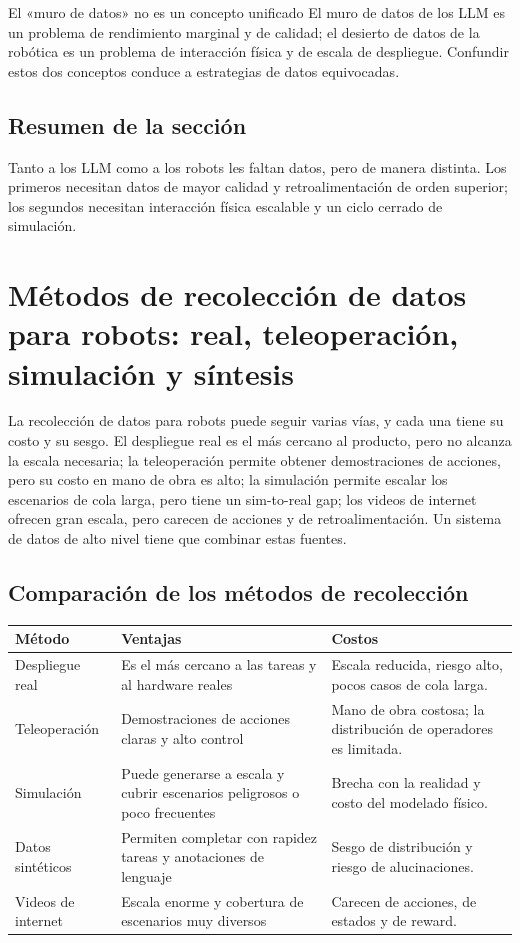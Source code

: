 \documentclass[a4paper]{article}
\begin{document}
\begin{importantbox}{El «muro de datos» no es un concepto unificado}
El muro de datos de los LLM es un problema de rendimiento marginal y de calidad; el desierto de datos de la robótica es un problema de interacción física y de escala de despliegue. Confundir estos dos conceptos conduce a estrategias de datos equivocadas.
\end{importantbox}

\subsection{Resumen de la sección}

Tanto a los LLM como a los robots les faltan datos, pero de manera distinta. Los primeros necesitan datos de mayor calidad y retroalimentación de orden superior; los segundos necesitan interacción física escalable y un ciclo cerrado de simulación.

\section{Métodos de recolección de datos para robots: real, teleoperación, simulación y síntesis}

La recolección de datos para robots puede seguir varias vías, y cada una tiene su costo y su sesgo. El despliegue real es el más cercano al producto, pero no alcanza la escala necesaria; la teleoperación permite obtener demostraciones de acciones, pero su costo en mano de obra es alto; la simulación permite escalar los escenarios de cola larga, pero tiene un sim-to-real gap; los videos de internet ofrecen gran escala, pero carecen de acciones y de retroalimentación. Un sistema de datos de alto nivel tiene que combinar estas fuentes.

\subsection{Comparación de los métodos de recolección}

\noindent\begin{longtable}{p{}p{}p{}}
\toprule
Método & Ventajas & Costos \\
\midrule
Despliegue real & Es el más cercano a las tareas y al hardware reales & Escala reducida, riesgo alto, pocos casos de cola larga. \\
Teleoperación & Demostraciones de acciones claras y alto control & Mano de obra costosa; la distribución de operadores es limitada. \\
Simulación & Puede generarse a escala y cubrir escenarios peligrosos o poco frecuentes & Brecha con la realidad y costo del modelado físico. \\
Datos sintéticos & Permiten completar con rapidez tareas y anotaciones de lenguaje & Sesgo de distribución y riesgo de alucinaciones. \\
Videos de internet & Escala enorme y cobertura de escenarios muy diversos & Carecen de acciones, de estados y de reward. \\
\bottomrule
\end{longtable}
\end{document}

